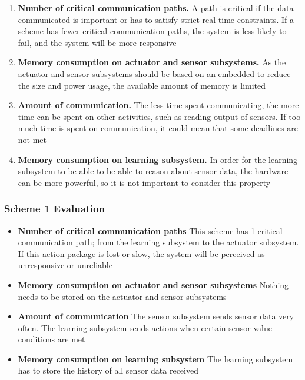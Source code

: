 \begin{enumerate}
\item \textbf{Number of critical communication paths.} A path is critical if the data communicated is important or has to satisfy strict real-time constraints. If a scheme has fewer critical communication paths, the system is less likely to fail, and the system will be more responsive
\item \textbf{Memory consumption on actuator and sensor subsystems.} As the actuator and sensor subsystems should be based on an embedded to reduce the size and power usage, the available amount of memory is limited
\item \textbf{Amount of communication.} The less time spent communicating, the more time can be spent on other activities, such as reading output of sensors. If too much time is spent on communication, it could mean that some deadlines are not met
\item \textbf{Memory consumption on learning subsystem.} In order for the learning subsystem to be able to be able to reason about sensor data, the hardware can be more powerful, so it is not important to consider this property
\end{enumerate}

\subsubsection{Scheme 1 Evaluation}
\begin{itemize}
\item \textbf{Number of critical communication paths} This scheme has 1 critical communication path; from the learning subsystem to the actuator subsystem. If this action package is lost or slow, the system will be perceived as unresponsive or unreliable
\item \textbf{Memory consumption on actuator and sensor subsystems} Nothing needs to be stored on the actuator and sensor subsystems
\item \textbf{Amount of communication} The sensor subsystem sends sensor data very often. The learning subsystem sends actions when certain sensor value conditions are met
\item \textbf{Memory consumption on learning subsystem} The learning subsystem has to store the history of all sensor data received
\end{itemize}

